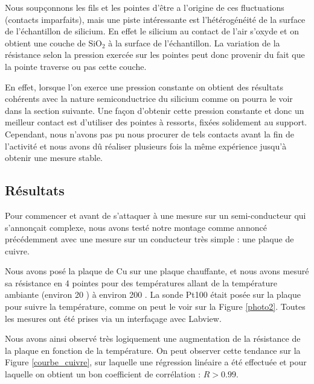 \bigskip

Nous soupçonnons les fils et les pointes d'être a l'origine de ces fluctuations (contacts imparfaits), mais une piste intéressante est l'hétérogénéité de la surface de l'échantillon de silicium. 
En effet le silicium au contact de l'air s'oxyde et on obtient une couche de SiO$_2$ à la surface de l'échantillon. 
La variation de la résistance selon la pression exercée sur les pointes peut donc provenir du fait que la pointe 
traverse ou pas cette couche.

En effet, lorsque l'on exerce une pression constante on obtient des résultats cohérents avec la nature semiconductrice du silicium comme on pourra le voir dans la section suivante. Une façon d'obtenir cette pression constante et donc un meilleur contact est d'utiliser des pointes à ressorts, fixées solidement au support. Cependant, nous n'avons pas pu nous procurer de tels contacts avant la fin de l'activité et nous avons dû réaliser plusieurs fois la même expérience jusqu'à obtenir une mesure stable.

\subsection{Résultats}
Pour commencer et avant de s'attaquer à une mesure sur un semi-conducteur qui s'annonçait complexe, 
nous avons testé notre montage comme annoncé précédemment avec une mesure sur un conducteur très simple : 
une plaque de cuivre.

Nous avons posé la plaque de Cu sur une plaque chauffante, et nous avons mesuré sa résistance en 4 pointes pour 
des températures allant de la température ambiante (environ 20 \celsius{}) à environ 200 \celsius{}. La sonde Pt100 était posée sur la plaque pour suivre la température, comme on peut le voir sur la Figure \ref{photo2}. Toutes les mesures ont été prises via un interfaçage avec Labview.

\bigskip

Nous avons ainsi observé très logiquement une augmentation de la résistance de la plaque en fonction de la température. On peut observer cette tendance sur la Figure \ref{courbe_cuivre}, sur laquelle une régression linéaire a été effectuée et pour laquelle on obtient un bon coefficient de corrélation : $R > 0.99$.

